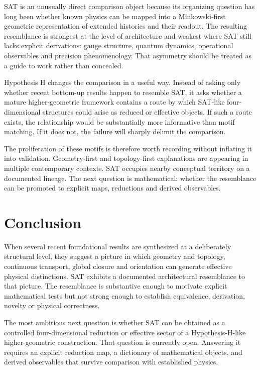 \documentclass[11pt]{article}
\begin{document}
SAT is an unusually direct comparison object because its organizing question has long been whether known physics can be mapped into a Minkowski-first geometric representation of extended histories and their readout. The resulting resemblance is strongest at the level of architecture and weakest where SAT still lacks explicit derivations: gauge structure, quantum dynamics, operational observables and precision phenomenology. That asymmetry should be treated as a guide to work rather than concealed.

Hypothesis H changes the comparison in a useful way. Instead of asking only whether recent bottom-up results happen to resemble SAT, it asks whether a mature higher-geometric framework contains a route by which SAT-like four-dimensional structures could arise as reduced or effective objects. If such a route exists, the relationship would be substantially more informative than motif matching. If it does not, the failure will sharply delimit the comparison.

The proliferation of these motifs is therefore worth recording without inflating it into validation. Geometry-first and topology-first explanations are appearing in multiple contemporary contexts. SAT occupies nearby conceptual territory on a documented lineage. The next question is mathematical: whether the resemblance can be promoted to explicit maps, reductions and derived observables.

\section{Conclusion}
When several recent foundational results are synthesized at a deliberately structural level, they suggest a picture in which geometry and topology, continuous transport, global closure and orientation can generate effective physical distinctions. SAT exhibits a documented architectural resemblance to that picture. The resemblance is substantive enough to motivate explicit mathematical tests but not strong enough to establish equivalence, derivation, novelty or physical correctness.

The most ambitious next question is whether SAT can be obtained as a controlled four-dimensional reduction or effective sector of a Hypothesis-H-like higher-geometric construction. That question is currently open. Answering it requires an explicit reduction map, a dictionary of mathematical objects, and derived observables that survive comparison with established physics.
\end{document}
